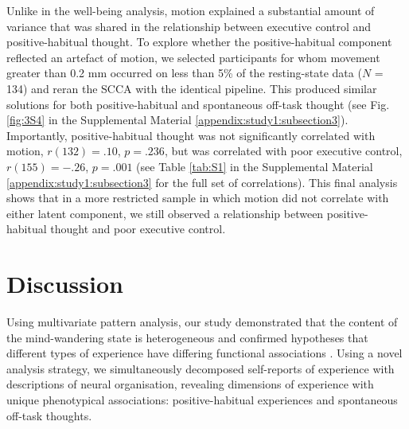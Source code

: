 Unlike in the well-being analysis, motion explained a substantial amount of variance that was shared in the relationship between executive control and positive-habitual thought. To explore whether the positive-habitual component reflected an artefact of motion, we selected participants for whom movement greater than 0.2 mm occurred on less than 5\% of the resting-state data (\(\mathit{N}\) = 134) and reran the SCCA with the identical pipeline. This produced similar solutions for both positive-habitual and spontaneous off-task thought (see Fig.\ref{fig:3S4} in the Supplemental Material \ref{appendix:study1:subsection3}). Importantly, positive-habitual thought was not significantly correlated with motion,
\(\mathit{r}(132) = .10\),
\(\mathit{p} = .236\),
but was correlated with poor executive control,
\(\mathit{r}(155) = -.26\),
\(\mathit{p} = .001\)
(see Table \ref{tab:S1} in the Supplemental Material \ref{appendix:study1:subsection3} for the full set of correlations).
This final analysis shows that in a more restricted sample in which motion did not correlate with either latent component, we still observed a relationship between positive-habitual thought and poor executive control.

\section{Discussion}
\label{study1:discussion}
Using multivariate pattern analysis, our study demonstrated that the content of the mind-wandering state is heterogeneous and confirmed hypotheses that different types of experience have differing functional associations \cite{SmallwoodCC2013}.
Using a novel analysis strategy, we simultaneously decomposed self-reports of experience with descriptions of neural organisation, revealing dimensions of experience with unique phenotypical associations: positive-habitual experiences and spontaneous off-task thoughts.

